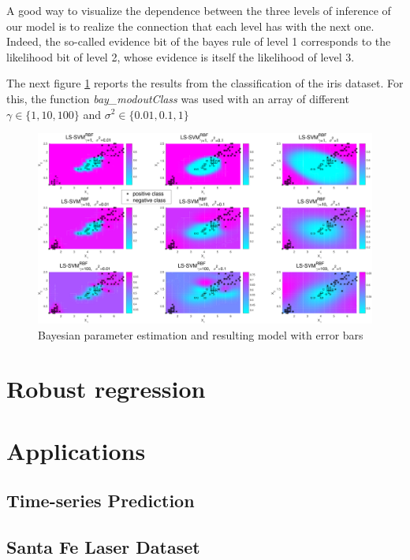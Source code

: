 \documentclass[11pt, a4paper]{article}
\begin{document}
A good way to visualize the dependence between the three levels of
inference of our model is to realize the connection that each level
has with the next one. Indeed, the so-called evidence bit of the bayes
rule of level 1 corresponds to the likelihood bit of level 2, whose
evidence is itself the likelihood of level 3.

The next figure \ref{fig:bayes_iris} reports the results from the
classification of the iris dataset. For this, the function
\emph{bay\_modoutClass} was used with an array of different
$\gamma \in \{1,10,100\}$ and $\sigma^2 \in \{0.01,0.1, 1\}$

\begin{figure}[H]
    \centering
    \includegraphics[scale=.40]{bayes_iris.pdf}
    \caption{Bayesian parameter estimation and resulting model with error bars}
    \label{fig:bayes_iris}
\end{figure}

\section{Robust regression}

\section{Applications}

\subsection{Time-series Prediction}

\subsection{Santa Fe Laser Dataset}

 
\end{document}
